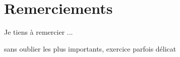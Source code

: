 \chapter*{Remerciements}
\thispagestyle{empty} 

\noindent Je tiens à remercier ... 

\medskip
sans oublier les plus importants, exercice parfois délicat
